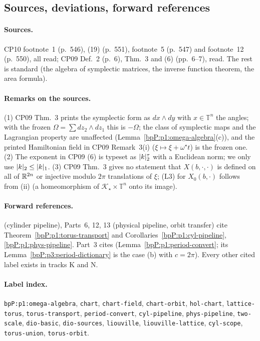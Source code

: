 \subsection{Sources, deviations, forward references}\label{bpP:p1:notes}

\paragraph{Sources.} CP10 footnote~1 (p.~546), (19) (p.~551), footnote~5 (p.~547) and footnote~12 (p.~550), all read; CP09 Def.~2 (p.~6), Thm.~3 and (6) (pp.~6--7), read. The rest is standard (the algebra of symplectic matrices, the inverse function theorem, the area formula).

\paragraph{Remarks on the sources.} (1) CP09 Thm.~3 prints the symplectic form as $dx\wedge dy$ with $x\in\mathbb T^n$ the angles; with the frozen $\Omega=\sum dz_2\wedge dz_1$ this is $-\Omega$; the class of symplectic maps and the Lagrangian property are unaffected (Lemma~\ref{bpP:p1:omega-algebra}(c)), and the printed Hamiltonian field in CP09 Remark~3(i) ($\xi\mapsto\xi+\omega^\star t$) is the frozen one. (2) The exponent in CP09 (6) is typeset as $\lvert k\rvert_2^{\tau}$ with a Euclidean norm; we only use $\lvert k\rvert_2\le\lvert k\rvert_1$. (3) CP09 Thm.~3 gives no statement that $X(b,\cdot,\cdot)$ is defined on all of $\mathbb{R}^{2n}$ or injective modulo $2\pi$ translations of $\xi$; (L3) for $X_0(b,\cdot)$ follows from (ii) (a homeomorphism of $\mathcal K_\star\times\mathbb T^n$ onto its image).

\paragraph{Forward references.}  (cylinder pipeline), Parts~6, 12, 13 (physical pipeline, orbit transfer) cite Theorem~\ref{bpP:p1:torus-transport} and Corollaries~\ref{bpP:p1:cyl-pipeline}, \ref{bpP:p1:phys-pipeline}. Part~3 cites  (Lemma~\ref{bpP:p1:period-convert}; its Lemma~\ref{bpP:p3:period-dictionary} is the case (b) with $c=2\pi$). Every other cited label exists in tracks K and N.

\paragraph{Label index.} \raggedright \texttt{bpP:p1:omega-algebra}, \texttt{chart}, \texttt{chart-field}, \texttt{chart-orbit}, \texttt{hol-chart}, \texttt{lattice-torus}, \texttt{torus-transport}, \texttt{period-convert}, \texttt{cyl-pipeline}, \texttt{phys-pipeline}, \texttt{two-scale}, \texttt{dio-basic}, \texttt{dio-sources}, \texttt{liouville}, \texttt{liouville-lattice}, \texttt{cyl-scope}, \texttt{torus-union}, \texttt{torus-orbit}.
\par\endgroup
